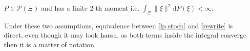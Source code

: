 \documentclass{amsart}
\begin{document}
\begin{assumption}
\label{h2} $P\in\mathcal{P}\left(\Xi\right)$ and has a finite $2$-th moment i.e. $\int_\Xi \lVert \xi\rVert^2\text{d}P\left(\xi\right) < \infty$.
\end{assumption}
\noindent Under these two assumptions, equivalence between \ref{lp stoch} and \ref{rewrite} is direct, even though it may look harsh, as both terms inside the integral converge then it is a matter of notation.
\end{document}
